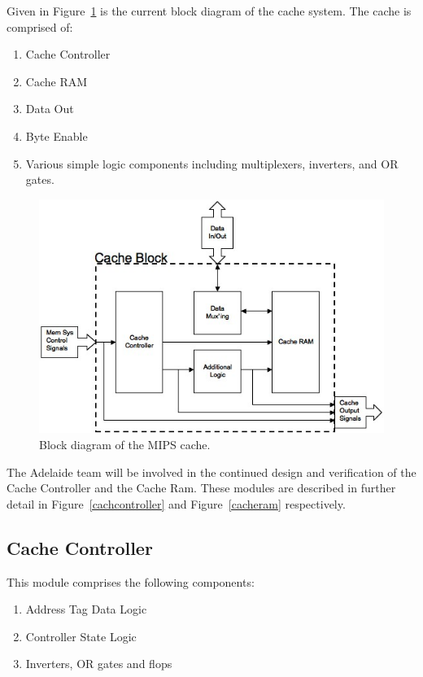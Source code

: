 \documentclass[a4paper,12pt]{article}
\begin{document}
Given in Figure~\ref{cacheblock} is the current block diagram of
the cache system. The cache is comprised of:
\begin{enumerate}
\item Cache Controller
\item Cache RAM
\item Data Out
\item Byte Enable
\item Various simple logic components including multiplexers,
  inverters, and OR gates.
\end{enumerate}

\begin{figure}
\centering 
\includegraphics[width=\textwidth]{cacheblock}
\caption{Block diagram of the MIPS cache.}
\label{cacheblock}
\end{figure}

The Adelaide team will be involved in the continued design and
verification of the Cache Controller and the Cache Ram. These modules
are described in further detail in Figure~\ref{cachcontroller} and
Figure~\ref{cacheram} respectively.

\subsection{Cache Controller}

This module comprises the following components: 
\begin{enumerate}
\item Address Tag Data Logic
\item Controller State Logic
\item Inverters, OR gates and flops
\end{enumerate}
\end{document}

